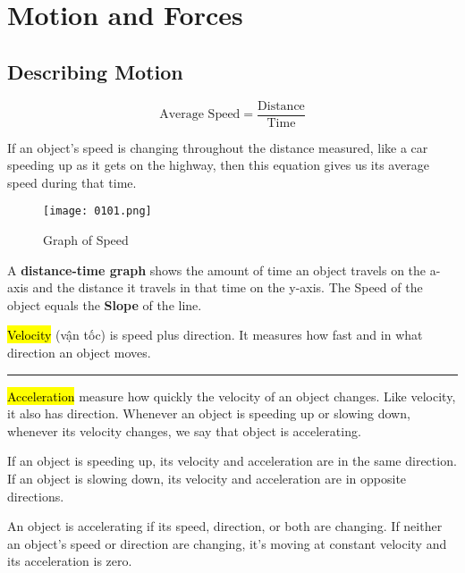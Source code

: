 \chapter{Motion and Forces}

\section{Describing Motion}

\begin{tcolorbox}[colback=red!5!white,colframe=red!75!black]
  \[\text{Average Speed}=\frac{\text{Distance}}{\text{Time}}\]
\end{tcolorbox}

If an object’s speed is changing throughout the distance measured, like a car speeding up as it gets on the highway, then this equation gives us its average speed during that time.

\vspace{.3cm}

\begin{figure}[htb!]
  \centering
  \texttt{[image: 0101.png]}
  \caption{Graph of Speed}
\end{figure}

A \textbf{distance-time graph} shows the amount of time an object travels on the a-axis and the distance it travels in that time on the y-axis. The Speed of the object equals the \textbf{Slope} of the line.

\vspace{.5cm}

\hl{Velocity} (vận tốc) is speed plus direction. It measures how fast and in what direction an object moves.

\noindent\rule{\textwidth}{0.4pt}

\hl{Acceleration} measure how quickly the velocity of an object changes. Like velocity, it also has direction. Whenever an object is speeding up or slowing down, whenever its velocity changes, we say that object is accelerating.

If an object is speeding up, its velocity and acceleration are in the same direction. If an object is slowing down, its velocity and acceleration are in opposite directions.

An object is accelerating if its speed, direction, or both are changing. If neither an object's speed or direction are changing, it's moving at constant velocity and its acceleration is zero.


